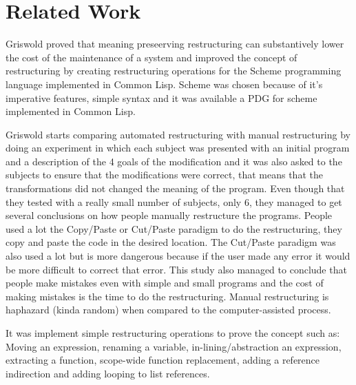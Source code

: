 
% 
% 

\section{Related Work}


Griswold \cite{griswold1991program} proved that meaning preseerving restructuring can substantively lower the cost of the maintenance of a system and improved the concept of restructuring by creating restructuring operations for the Scheme programming language implemented in Common Lisp. Scheme was chosen because of it's imperative features, simple syntax and it was available a PDG for scheme implemented in Common Lisp.


Griswold starts comparing automated restructuring with manual restructuring by doing an experiment in which each subject was presented with an initial program and a description of the 4 goals of the modification and it was also asked to the subjects to ensure that the modifications were correct, that means that the transformations did not changed the meaning of the program. Even though that they tested with a really small number of subjects, only 6, they managed to get several conclusions on how people manually restructure the programs.
People used a lot the Copy/Paste or Cut/Paste paradigm to do the restructuring, they copy and paste the code in the desired location. The Cut/Paste paradigm was also used a lot but is more dangerous because if the user made any error it would be more difficult to correct that error. 
This study also managed to conclude that people make mistakes even with simple and small programs and the cost of making mistakes is the time to do the restructuring.
Manual restructuring is haphazard (kinda random) when compared to the computer-assisted process.


It was implement simple restructuring operations to prove the concept such as: Moving an expression, renaming a variable, in-lining/abstraction an expression, extracting a function, scope-wide function replacement, adding a reference indirection and adding looping to list references.


